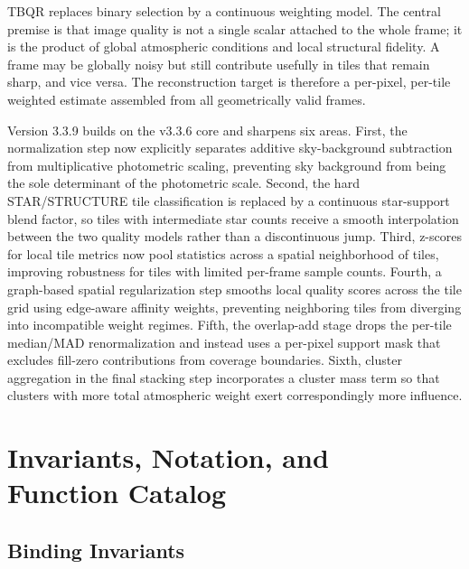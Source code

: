 \documentclass[10pt,twocolumn]{article}
\begin{document}
TBQR replaces binary selection by a continuous weighting model. The central premise is that
image quality is not a single scalar attached to the whole frame; it is the product of global
atmospheric conditions and local structural fidelity. A frame may be globally noisy but still
contribute usefully in tiles that remain sharp, and vice versa. The reconstruction target is
therefore a per-pixel, per-tile weighted estimate assembled from all geometrically valid frames.

Version 3.3.9 builds on the v3.3.6 core and sharpens six areas. First, the normalization step
now explicitly separates additive sky-background subtraction from multiplicative photometric
scaling, preventing sky background from being the sole determinant of the photometric scale.
Second, the hard STAR/STRUCTURE tile classification is replaced by a continuous star-support
blend factor, so tiles with intermediate star counts receive a smooth interpolation between the
two quality models rather than a discontinuous jump. Third, z-scores for local tile metrics now
pool statistics across a spatial neighborhood of tiles, improving robustness for tiles with
limited per-frame sample counts. Fourth, a graph-based spatial regularization step smooths local
quality scores across the tile grid using edge-aware affinity weights, preventing neighboring
tiles from diverging into incompatible weight regimes. Fifth, the overlap-add stage drops the
per-tile median/MAD renormalization and instead uses a per-pixel support mask that excludes
fill-zero contributions from coverage boundaries. Sixth, cluster aggregation in the final stacking
step incorporates a cluster mass term so that clusters with more total atmospheric weight exert
correspondingly more influence.

\section{Invariants, Notation, and \protect \\Function Catalog}

\subsection{Binding Invariants}
\end{document}
